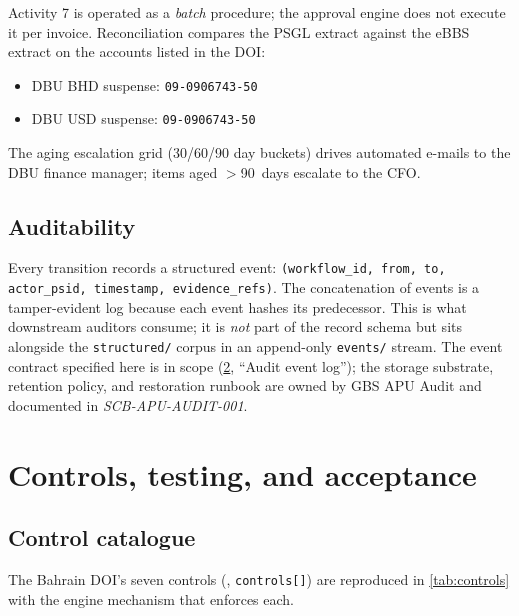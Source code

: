 \documentclass[11pt,a4paper,twoside]{report}
\newcommand{\corpus}{}
\begin{document}
Activity 7 is operated as a \emph{batch} procedure; the approval engine
does not execute it per invoice. Reconciliation compares the PSGL
extract against the eBBS extract on the accounts listed in the DOI:

\begin{itemize}
  \item DBU BHD suspense: \texttt{09-0906743-50}
  \item DBU USD suspense: \texttt{09-0906743-50}
\end{itemize}

The aging escalation grid (30/60/90 day buckets) drives automated
e-mails to the DBU finance manager; items aged $>$90~days escalate to
the CFO.

\section{Auditability}

Every transition records a structured event:
\texttt{(workflow\_id, from, to, actor\_psid, timestamp, evidence\_refs)}.
The concatenation of events is a tamper-evident log because each event
hashes its predecessor. This is what downstream auditors consume; it
is \emph{not} part of the record schema but sits alongside the
\texttt{structured/} corpus in an append-only \texttt{events/} stream.
The event contract specified here is in scope (\cref{ch:controls},
``Audit event log''); the storage substrate, retention policy, and
restoration runbook are owned by GBS APU Audit and documented in
\emph{SCB-APU-AUDIT-001}.
\chapter{Controls, testing, and acceptance}\label{ch:controls}

\section{Control catalogue}

The Bahrain DOI's seven controls
(\corpus{},
\texttt{controls[]}) are reproduced in \cref{tab:controls} with the
engine mechanism that enforces each.
\end{document}
